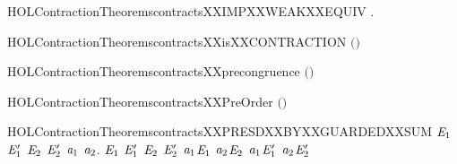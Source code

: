 \newcommand{\HOLContractionTheoremscontractsXXEPSYY}{\UseVerbatim{HOLContractionTheoremscontractsXXEPSYY}}
\begin{SaveVerbatim}{HOLContractionTheoremscontractsXXIMPXXWEAKXXEQUIV}
\HOLTokenTurnstile{} \HOLSymConst{\HOLTokenForall{}} .    \HOLSymConst{\HOLTokenImp{}}   
\end{SaveVerbatim}
\newcommand{\HOLContractionTheoremscontractsXXIMPXXWEAKXXEQUIV}{\UseVerbatim{HOLContractionTheoremscontractsXXIMPXXWEAKXXEQUIV}}
\begin{SaveVerbatim}{HOLContractionTheoremscontractsXXisXXCONTRACTION}
\HOLTokenTurnstile{}  \ensuremath{(}\ensuremath{)}
\end{SaveVerbatim}
\newcommand{\HOLContractionTheoremscontractsXXisXXCONTRACTION}{\UseVerbatim{HOLContractionTheoremscontractsXXisXXCONTRACTION}}
\begin{SaveVerbatim}{HOLContractionTheoremscontractsXXprecongruence}
\HOLTokenTurnstile{}  \ensuremath{(}\ensuremath{)}
\end{SaveVerbatim}
\newcommand{\HOLContractionTheoremscontractsXXprecongruence}{\UseVerbatim{HOLContractionTheoremscontractsXXprecongruence}}
\begin{SaveVerbatim}{HOLContractionTheoremscontractsXXPreOrder}
\HOLTokenTurnstile{}  \ensuremath{(}\ensuremath{)}
\end{SaveVerbatim}
\newcommand{\HOLContractionTheoremscontractsXXPreOrder}{\UseVerbatim{HOLContractionTheoremscontractsXXPreOrder}}
\begin{SaveVerbatim}{HOLContractionTheoremscontractsXXPRESDXXBYXXGUARDEDXXSUM}
\HOLTokenTurnstile{} \HOLSymConst{\HOLTokenForall{}}\ensuremath{\HOLBoundVar{E}\sb{\mathrm{1}}} \ensuremath{\HOLBoundVar{E}\sb{\mathrm{1}}\sp{\prime{}}} \ensuremath{\HOLBoundVar{E}\sb{\mathrm{2}}} \ensuremath{\HOLBoundVar{E}\sb{\mathrm{2}}\sp{\prime{}}} \ensuremath{\HOLBoundVar{a}\sb{\mathrm{1}}} \ensuremath{\HOLBoundVar{a}\sb{\mathrm{2}}}.
     \ensuremath{\HOLBoundVar{E}\sb{\mathrm{1}}}  \ensuremath{\HOLBoundVar{E}\sb{\mathrm{1}}\sp{\prime{}}} \HOLSymConst{\HOLTokenConj{}} \ensuremath{\HOLBoundVar{E}\sb{\mathrm{2}}}  \ensuremath{\HOLBoundVar{E}\sb{\mathrm{2}}\sp{\prime{}}} \HOLSymConst{\HOLTokenImp{}}
     \ensuremath{\HOLBoundVar{a}\sb{\mathrm{1}}}\HOLSymConst{\ensuremath{\ldotp}}\ensuremath{\HOLBoundVar{E}\sb{\mathrm{1}}} \HOLSymConst{\ensuremath{+}} \ensuremath{\HOLBoundVar{a}\sb{\mathrm{2}}}\HOLSymConst{\ensuremath{\ldotp}}\ensuremath{\HOLBoundVar{E}\sb{\mathrm{2}}}  \ensuremath{\HOLBoundVar{a}\sb{\mathrm{1}}}\HOLSymConst{\ensuremath{\ldotp}}\ensuremath{\HOLBoundVar{E}\sb{\mathrm{1}}\sp{\prime{}}} \HOLSymConst{\ensuremath{+}} \ensuremath{\HOLBoundVar{a}\sb{\mathrm{2}}}\HOLSymConst{\ensuremath{\ldotp}}\ensuremath{\HOLBoundVar{E}\sb{\mathrm{2}}\sp{\prime{}}}
\end{SaveVerbatim}
